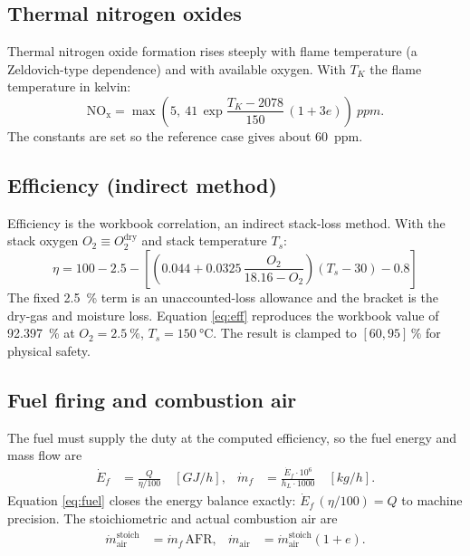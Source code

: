 \documentclass[11pt,a4paper]{article}
\begin{document}
\subsection{Thermal nitrogen oxides}
Thermal nitrogen oxide formation rises steeply with flame temperature (a
Zeldovich-type dependence) and with available oxygen. With $T_K$ the flame
temperature in kelvin:
\begin{equation}
\mathrm{NO_x} = \max\!\left(5,\ 41\,\exp\!\frac{T_K-2078}{150}\,(1+3e)\right)\ \si{ppm}.
\end{equation}
The constants are set so the reference case gives about \SI{60}{ppm}.

\subsection{Efficiency (indirect method)}
Efficiency is the workbook correlation, an indirect stack-loss method. With the
stack oxygen $O_2\equiv O_2^\mathrm{dry}$ and stack temperature $T_s$:
\begin{equation}
\boxed{\;\eta = 100 - 2.5 - \left[\left(0.044 + 0.0325\,\frac{O_2}{18.16-O_2}\right)(T_s-30) - 0.8\right]\;}
\label{eq:eff}
\end{equation}
The fixed \SI{2.5}{\percent} term is an unaccounted-loss allowance and the bracket
is the dry-gas and moisture loss. Equation \eqref{eq:eff} reproduces the workbook
value of \SI{92.397}{\percent} at $O_2=\SI{2.5}{\percent}$,
$T_s=\SI{150}{\celsius}$. The result is clamped to $[60,95]\,\si{\percent}$ for
physical safety.

\subsection{Fuel firing and combustion air}
The fuel must supply the duty at the computed efficiency, so the fuel energy and
mass flow are
\begin{align}
\dot E_f &= \frac{Q}{\eta/100}\quad[\si{GJ/h}], &
\dot m_f &= \frac{\dot E_f\cdot 10^6}{h_L\cdot 1000}\quad[\si{kg/h}].
\label{eq:fuel}
\end{align}
Equation \eqref{eq:fuel} closes the energy balance exactly:
$\dot E_f\,(\eta/100)=Q$ to machine precision. The stoichiometric and actual
combustion air are
\begin{align}
\dot m_\mathrm{air}^\mathrm{stoich} &= \dot m_f\,\mathrm{AFR}, &
\dot m_\mathrm{air} &= \dot m_\mathrm{air}^\mathrm{stoich}(1+e).
\end{align}
\end{document}
